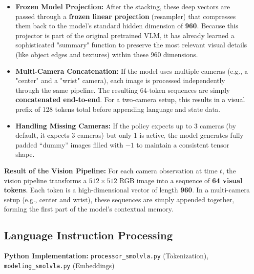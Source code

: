 \documentclass[11pt,a4paper]{article}
\begin{document}
\begin{itemize}
\begin{itemize}
        \item \textbf{The "Goldilocks" Trade-off (Why not 1 Token?):} While fewer tokens are faster, compressing the entire image into just \textbf{1 token} would create a massive \textbf{Information Bottleneck} (trying to fit all details into just 960 dimensions). Furthermore, the \textbf{Attention Mechanism} requires multiple tokens to compare relationships (e.g., comparing the robot's gripper to the object). The \textbf{64 tokens} maintain an $8 \times 8$ grid, preserving enough \textbf{Spatial Awareness} for the model to know *where* objects are relative to each other, while still bypassing the quadratic math explosion.
    \end{itemize}
    \item \textbf{Frozen Model Projection:} After the stacking, these deep vectors are passed through a \textbf{frozen linear projection} (resampler) that compresses them back to the model's standard hidden dimension of \textbf{960}. Because this projector is part of the original pretrained VLM, it has already learned a sophisticated "summary" function to preserve the most relevant visual details (like object edges and textures) within these 960 dimensions.
    \item \textbf{Multi-Camera Concatenation:} If the model uses multiple cameras (e.g., a "center" and a "wrist" camera), each image is processed independently through the same pipeline. The resulting 64-token sequences are simply \textbf{concatenated end-to-end}. For a two-camera setup, this results in a visual prefix of 128 tokens total before appending language and state data.
    \item \textbf{Handling Missing Cameras:} If the policy expects up to 3 cameras (by default, it expects 3 cameras) but only 1 is active, the model generates fully padded ``dummy'' images filled with $-1$ to maintain a consistent tensor shape.
\end{itemize}

\textbf{Result of the Vision Pipeline:} For each camera observation at time $t$, the vision pipeline transforms a $512 \times 512$ RGB image into a sequence of \textbf{64 visual tokens}. Each token is a high-dimensional vector of length \textbf{960}. In a multi-camera setup (e.g., center and wrist), these sequences are simply appended together, forming the first part of the model's contextual memory. 

\subsection{Language Instruction Processing}
\textbf{Python Implementation:} \texttt{processor\_smolvla.py} (Tokenization), \texttt{modeling\_smolvla.py} (Embeddings)
\end{document}
